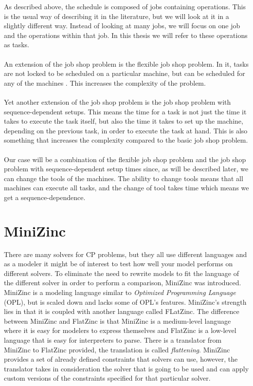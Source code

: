 As described above, the schedule is composed of jobs containing operations. This is the usual way of describing it in the literature, but we will look at it in a slightly different way. Instead of looking at many jobs, we will focus on one job and the operations within that job. In this thesis we will refer to these operations as tasks.
\\\\
An extension of the job shop problem is the flexible job shop problem. In it, tasks are not locked to be scheduled on a particular machine, but can be scheduled for any of the machines \cite{thornblad_2013}. This increases the complexity of the problem.
\\\\
Yet another extension of the job shop problem is the job shop problem with sequence-dependent setups. This means the time for a task is not just the time it takes to execute the task itself, but also the time it takes to set up the machine, depending on the previous task, in order to execute the task at hand. This is also something that increases the complexity compared to the basic job shop problem.
\\\\
Our case will be a combination of the flexible job shop problem and the job shop problem with sequence-dependent setup times since, as will be described later, we can change the tools of the machines. The ability to change tools means that all machines can execute all tasks, and the change of tool takes time which means we get a sequence-dependence.

\section{MiniZinc}
There are many solvers for CP problems, but they all use different languages and as a modeler it might be of interest to test how well your model performs on different solvers. To eliminate the need to rewrite models to fit the language of the different solver in order to perform a comparison, MiniZinc was introduced. MiniZinc is a modeling language similar to \emph{Optimized Programming Language} (OPL), but is scaled down and lacks some of OPL's features. MiniZinc's strength lies in that it is coupled with another language called FLatZinc. The difference between MiniZinc and FlatZinc is that MiniZinc is a medium-level language where it is easy for modelers to express themselves and FlatZinc is a low-level language that is easy for interpreters to parse. There is a translator from MiniZinc to FlatZinc provided, the translation is called \emph{flattening}. MiniZinc provides a set of already defined constraints that solvers can use, however, the translator takes in consideration the solver that is going to be used and can apply custom versions of the constraints specified for that particular solver.
\cite{mz_paper}


